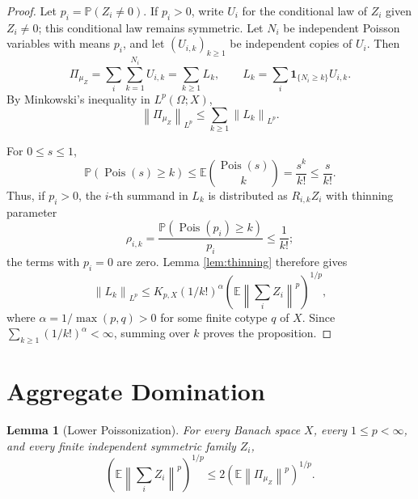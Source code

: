 \documentclass[11pt]{article}
\newtheorem{lemma}{Lemma}
\newcommand{\E}{\mathbb E}
\newcommand{\Pp}{\mathbb P}
\newcommand{\norm}[1]{\left\lVert #1\right\rVert}
\newcommand{\1}{\mathbf 1}
\begin{document}
\begin{proof}
Let \(p_i=\Pp(Z_i\ne0)\).  If \(p_i>0\), write \(U_i\) for the conditional
law of \(Z_i\) given \(Z_i\ne0\); this conditional law remains symmetric.
Let \(N_i\) be independent Poisson variables with means \(p_i\), and let
\((U_{i,k})_{k\ge1}\) be independent copies of \(U_i\).  Then
\[
  \Pi_{\mu_Z}=\sum_i\sum_{k=1}^{N_i}U_{i,k}
  =
  \sum_{k\ge1} L_k,
  \qquad
  L_k=\sum_i \1_{\{N_i\ge k\}}U_{i,k}.
\]
By Minkowski's inequality in \(L^p(\Omega;X)\),
\[
  \norm{\Pi_{\mu_Z}}_{L^p}
  \le
  \sum_{k\ge1}\norm{L_k}_{L^p}.
\]

For \(0\le s\le1\),
\[
  \Pp(\operatorname{Pois}(s)\ge k)
  \le
  \E\binom{\operatorname{Pois}(s)}{k}
  =
  \frac{s^k}{k!}
  \le
  \frac{s}{k!}.
\]
Thus, if \(p_i>0\), the \(i\)-th summand in \(L_k\) is distributed as
\(R_{i,k}Z_i\) with thinning parameter
\[
  \rho_{i,k}=\frac{\Pp(\operatorname{Pois}(p_i)\ge k)}{p_i}
  \le \frac{1}{k!};
\]
the terms with \(p_i=0\) are zero.  Lemma \ref{lem:thinning}
therefore gives
\[
  \norm{L_k}_{L^p}
  \le
  K_{p,X}(1/k!)^\alpha
  \left(\E\norm{\sum_i Z_i}^p\right)^{1/p},
\]
where \(\alpha=1/\max(p,q)>0\) for some finite cotype \(q\) of \(X\).
Since \(\sum_{k\ge1}(1/k!)^\alpha<\infty\), summing over \(k\) proves the
proposition.
\end{proof}

\section*{Aggregate Domination}

\begin{lemma}[Lower Poissonization]
\label{lem:lower}
For every Banach space \(X\), every \(1\le p<\infty\), and every finite
independent symmetric family \(Z_i\),
\[
  \left(\E\norm{\sum_iZ_i}^p\right)^{1/p}
  \le
  2\left(\E\norm{\Pi_{\mu_Z}}^p\right)^{1/p}.
\]
\end{lemma}
\end{document}
